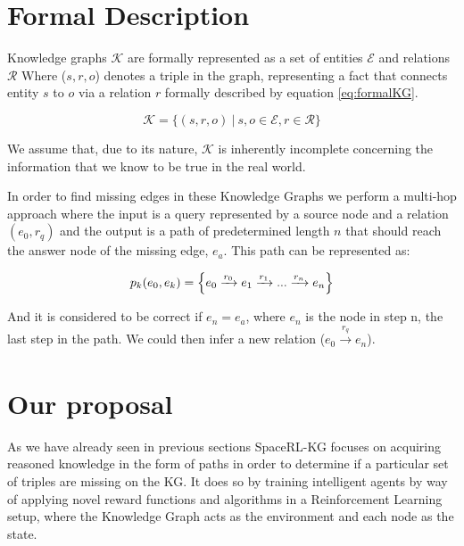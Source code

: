 \section{Formal Description}\label{sec:spacerl-formal_description}


Knowledge graphs $\mathcal{K}$ are formally represented as a set of entities $\mathcal{E}$ and relations $ \mathcal{R}$ Where ($s, r, o$) denotes a triple in the graph, representing a fact that connects entity $s$ to $o$ via a relation $r$ formally described by equation \ref{eq:formalKG}. 

\begin{equation}
\label{eq:formalKG}
\mathcal{K} = \{ (s, r, o) ~|~ s, o \in \mathcal{E}, r \in \mathcal{R} \}
\end{equation}

We assume that, due to its nature, \( \mathcal{K} \) is inherently incomplete concerning the information that we know to be true in the real world.

In order to find missing edges in these Knowledge Graphs we perform a multi-hop approach where the input is a query represented by a source node and a relation $(e_0,r_q)$ and the output is a path of predetermined length $n$ that should reach the answer node of the missing edge, $e_a$. This path can be represented as:

\begin{equation}
\label{eq:formalPath}
p_k(e_0,e_k) =  \Bigl\{ e_0 \xrightarrow[]{r_0} e_1 \xrightarrow[]{r_1} ... \xrightarrow[]{r_n} e_n \Bigl\}
\end{equation}

And it is considered to be correct if $e_n = e_a$, where $e_n$ is the node in step n, the last step in the path. We could then infer a new relation ($e_0\xrightarrow[]{r_q}e_n$).


\section{Our proposal}\label{sec:spacerl-proposal}
As we have already seen in previous sections SpaceRL-KG focuses on acquiring reasoned knowledge in the form of paths in order to determine if a particular set of triples are missing on the KG.
It does so by training intelligent agents by way of applying novel reward functions and algorithms in a Reinforcement Learning setup, where the Knowledge Graph acts as the environment and each node as the state.

